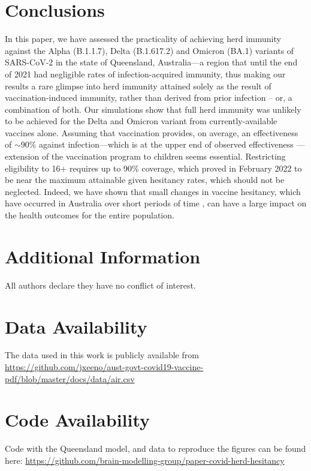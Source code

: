 \documentclass[article, a4, authoryear]{elsarticle}
\begin{document}
\section{Conclusions}
\label{sec:conclusion}
In this paper, we have assessed the practicality of achieving herd immunity against the Alpha (B.1.1.7), Delta (B.1.617.2) and Omicron (BA.1) variants of SARS-CoV-2 in the state of Queensland, Australia---a region that until the end of 2021 had negligible rates of infection-acquired immunity, thus making our results a rare glimpse into herd immunity attained solely as the result of vaccination-induced immunity, rather than derived from prior infection -- or, a combination of both.  
Our simulations show that full herd immunity was unlikely to be achieved for the Delta and Omicron variant from currently-available vaccines alone. Assuming that vaccination provides, on average, an effectiveness of $\sim$90\% against infection---which is at the upper end of observed effectiveness \cite{pouwels2021vax_eff, ukhsa-vaccine-omicron}---extension of the vaccination program to children seems essential. Restricting eligibility to 16+ requires up to 90\% coverage, which proved in February 2022 to be near the maximum attainable given hesitancy rates, which should not be neglected. Indeed,  we have shown that small changes in vaccine hesitancy, which have occurred in Australia over short periods of time \cite{biddle_change_2021}, can have a large impact on the health outcomes for the entire population. 



\section*{Additional Information}

\medskip \noindent
All authors declare they have no conflict of interest. 

\section*{Data Availability}
The data used in this work is publicly available from \url{https://github.com/jxeeno/aust-govt-covid19-vaccine-pdf/blob/master/docs/data/air.csv}

\section*{Code Availability}
Code with the Queensland model, and data to reproduce the figures can be found here: 
\url{https://github.com/brain-modelling-group/paper-covid-herd-hesitancy}
\end{document}
